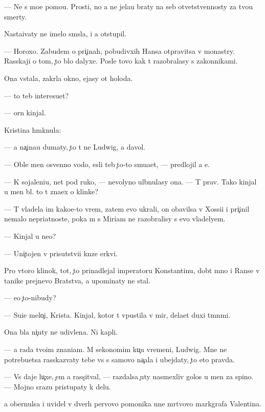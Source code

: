 \documentclass[10pt]{book}
\begin{document}
— Ne s mo{\y}e{\y} pomo{\x}{\y}u. Prosti, no {\y}a ne jela{\y}u braty na seb{\ia} otvetstvennosty za tvo{\y}u smerty.

Nasta{\y}ivaty ne imelo sm{\yi}sla, i {\y}a otstupil.

— Horoxo. Zabudem o pri{\c}inah, pobudivxih Hansa otpravitsa v monast{\yi}ry. Rasskaji o tom, {\c}to b{\yi}lo dalyxe. Posle tovo kak t{\yi} razobralasy s zakonnikami.

Ona vstala, zakr{\yi}la okno, {\y}ejasy ot holoda.

— {\C}to teb{\ia} interesu{\y}et?

—  {\C}orn{\yi}{\y} kinjal.

Kristina hm{\yi}knula:

— {\Y}a na{\c}ina{\y}u dumaty, {\c}to t{\yi} ne Ludwig, a d{\y}avol.

— Oble{\y} men{\ia} osv{\ia}{\x}enno{\y} vodo{\y}, {\y}esli teb{\ia} {\c}to-to smu{\x}a{\y}et, — predlojil {\y}a {\y}e{\y}.

— K sojaleni{\y}u, net pod ruko{\y}, — nevolyno ul{\yi}bnulasy ona. — T{\yi} prav. Tako{\y} kinjal u men{\ia} b{\yi}l. {\C}to t{\yi} zna{\y}ex o klinke?

— T{\yi} vladela im kako{\y}e-to vrem{\ia}, zatem {\y}evo ukrali, on ob{\y}avilsa v Xossi{\y}i i pri{\c}inil nemalo nepri{\y}atnoste{\y}, poka m{\yi} s Miriam ne razobralisy s {\y}evo vladely{\q}em.

— Kinjal u ne{\y}o?

— Uni{\c}tojen v prisutstvi{\y}i kn{\ia}ze{\y} {\Q}erkvi.

Pro vtoro{\y} klinok, tot, {\c}to prinadlejal imperatoru Konstantinu, dob{\yi}t{\yi}{\y} mno{\y} i Ranse v ta{\y}nike prejnevo Bratstva, {\y}a upominaty ne stal.

— {\y}e{\x}o {\c}to-nibudy?

— Su{\x}i{\y}e melo{\c}i, Krista. Kinjal, kotor{\yi}{\y} t{\yi} v{\yi}pustila v mir, dela{\y}et duxi t{\e}mn{\yi}mi.

Ona b{\yi}la ni{\c}uty ne udivlena. Ni kapli.

— {\Y}a rada tvo{\y}im znani{\y}am. M{\yi} sekonomim ku{\c}u vremeni, Ludwig. Mne ne potrebu{\y}etsa rasskaz{\yi}vaty tebe vs{\e} s samovo na{\c}ala i ubejdaty, {\c}to eto pravda.

— Vs{\e} daje lu{\c}xe, {\c}em {\y}a rass{\c}it{\yi}val, — razdalsa {\c}uty nasmexliv{\yi}{\y} golos u men{\ia} za spino{\y}. — Mojno srazu pristupaty k delu.

{\Y}a obernulsa i uvidel v dver{\ia}h pervovo pomo{\x}nika n{\yi}ne m{\e}rtvovo markgrafa Valentina.
\end{document}
